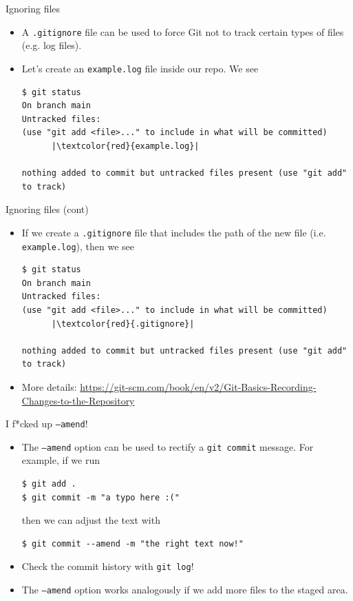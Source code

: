 \documentclass[
hyperref={bookmarks=false},
xcolor={dvipsnames,svgnames*,x11names*}, 
12pt
]{beamer}
\begin{document}
\begin{frame}[fragile]{Ignoring files}
\vspace{-0.5cm}
\begin{itemize}
\itemsep 2ex
\item A \texttt{.gitignore} file can be used to force Git not to track certain types of files (e.g. log files). 
\item Let's create an \texttt{example.log} file inside our repo. We see 
\begin{lstlisting}
$ git status
On branch main
Untracked files:
(use "git add <file>..." to include in what will be committed)
      |\textcolor{red}{example.log}|

nothing added to commit but untracked files present (use "git add" to track)
\end{lstlisting}
\end{itemize}
\end{frame}

\begin{frame}[fragile]{Ignoring files (cont)}
\vspace{-0.5cm}
\begin{itemize}
\itemsep 2ex
\item If we create a \texttt{.gitignore} file that includes the path of the new file (i.e. \texttt{example.log}), then we see
\begin{lstlisting}
$ git status
On branch main
Untracked files:
(use "git add <file>..." to include in what will be committed)
      |\textcolor{red}{.gitignore}|

nothing added to commit but untracked files present (use "git add" to track)
\end{lstlisting}
\item More details: \url{https://git-scm.com/book/en/v2/Git-Basics-Recording-Changes-to-the-Repository}
\end{itemize}
\end{frame}

\begin{frame}[fragile]{I f*cked up  \texttt{--amend}!}
\vspace{-0.5cm}
\begin{itemize}
\itemsep 2ex
\item The \texttt{--amend} option can be used to rectify a \texttt{git commit} message. For example, if we run
\begin{lstlisting}
$ git add . 
$ git commit -m "a typo here :("
\end{lstlisting} 
then we can adjust the text with
\begin{lstlisting}
$ git commit --amend -m "the right text now!"
\end{lstlisting}
\item Check the commit history with \texttt{git log}!
\item The \texttt{--amend} option works analogously if we add more files to the staged area. 
\end{itemize}
\end{frame}
\end{document}
